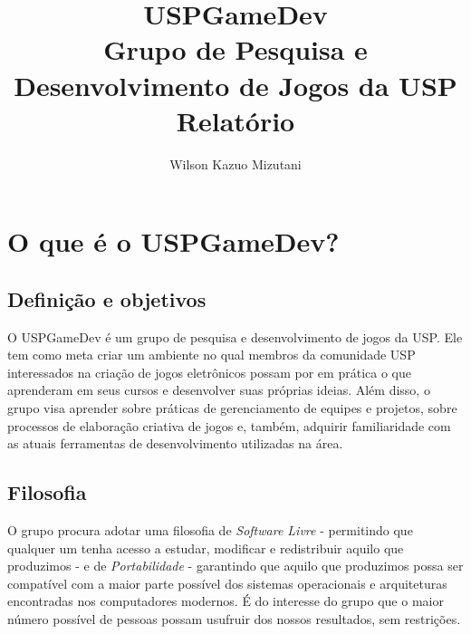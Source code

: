 \documentclass[12pt,onecolumn,a4paper]{article}
\begin{document}
\begin{titlepage}

    \title{
        \bf
        \Huge  USPGameDev \\
        \normalsize Grupo de Pesquisa e Desenvolvimento de Jogos da USP \\
        \LARGE Relatório
    }
    \author{Wilson Kazuo Mizutani}
    
    \maketitle
    
    \thispagestyle{empty}
    
\end{titlepage}


\tableofcontents

\clearpage

\pagestyle{myheadings}



\section{\LARGE O que é o USPGameDev?}

    \subsection{Definição e objetivos}
        O USPGameDev é um grupo de pesquisa e desenvolvimento de jogos da USP. Ele tem como meta
        criar um ambiente no qual membros da comunidade USP interessados na criação de jogos
        eletrônicos possam por em prática o que aprenderam em seus cursos e desenvolver suas
        próprias ideias. Além disso, o grupo visa aprender sobre práticas de gerenciamento de
        equipes e projetos, sobre processos de elaboração criativa de jogos e, também, adquirir
        familiaridade com as atuais ferramentas de desenvolvimento utilizadas na área.
    
    \subsection{Filosofia}
        O grupo procura adotar uma filosofia de {\it Software Livre} - permitindo que qualquer um
        tenha acesso a estudar, modificar e redistribuir aquilo que produzimos - e de {\it
        Portabilidade} - garantindo que aquilo que produzimos possa ser compatível com a maior parte
        possível dos sistemas operacionais e arquiteturas encontradas nos computadores modernos. É
        do interesse do grupo que o maior número possível de pessoas possam usufruir dos nossos
        resultados, sem restrições.
    
\end{document}
